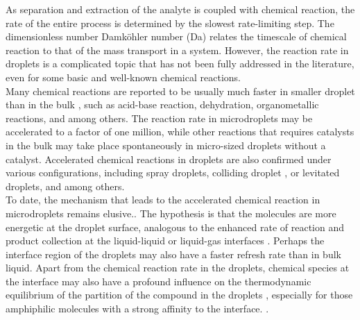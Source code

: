 \documentclass[journal=langd5,manuscript=article]{achemso}
\begin{document}
As separation and extraction of the analyte is coupled with chemical reaction, the rate of the entire process is determined by the slowest rate-limiting step. The dimensionless number Damköhler number (Da) relates the timescale of chemical reaction to that of the mass transport in a system. \cite{fogler2010essentials} However, the reaction rate in droplets is a complicated topic that has not been fully addressed in the literature, even for some basic and well-known chemical reactions. \\
Many chemical reactions are reported to be usually much faster in smaller droplet than in the bulk \cite{li2020speeding,dyett2020accelerated}, such as acid-base reaction,\cite{li2020speeding} dehydration,\cite{li2018accelerated} organometallic reactions\cite{fedick2019screening}, and among others. The reaction rate in microdroplets may be accelerated to a factor of one million, \cite{wei2020accelerated,lee2015microdroplet} while other reactions that requires catalysts in the bulk may take place spontaneously in micro-sized droplets without a catalyst. \cite{nam2017abiotic}  Accelerated chemical reactions in droplets are also confirmed under various configurations,\cite{li2018accelerated,girod2011accelerated,bain2016accelerated,bain2015accelerated} including spray droplets\cite{girod2011accelerated,fenn1990electrospray}, colliding droplet \cite{lee2015microdroplet,lee2017microdroplet}, or levitated droplets, \cite{li2018accelerated, crawford2016real} and among others. \cite{chen2008organic,chen2006cis}\\
To date, the mechanism that leads to the accelerated chemical reaction in microdroplets remains elusive.\cite{wei2020accelerated}. The hypothesis is that the molecules are more energetic at the droplet surface, \cite{zhou2018fluorescence} analogous to the enhanced rate of reaction and product collection at the liquid-liquid or liquid-gas interfaces \cite{wei2020accelerated}. Perhaps the interface region of the droplets may also have a faster refresh rate than in bulk liquid. \cite{fallah2014enhanced} Apart from the chemical reaction rate in the droplets, chemical species at the interface may also have a profound influence on the thermodynamic equilibrium of the partition of the compound in the droplets \cite{fallah2014enhanced}, especially for those amphiphilic molecules with a strong affinity to the interface.  \cite{rezaee2010evolution,wells2020high}. \\
 
\end{document}
